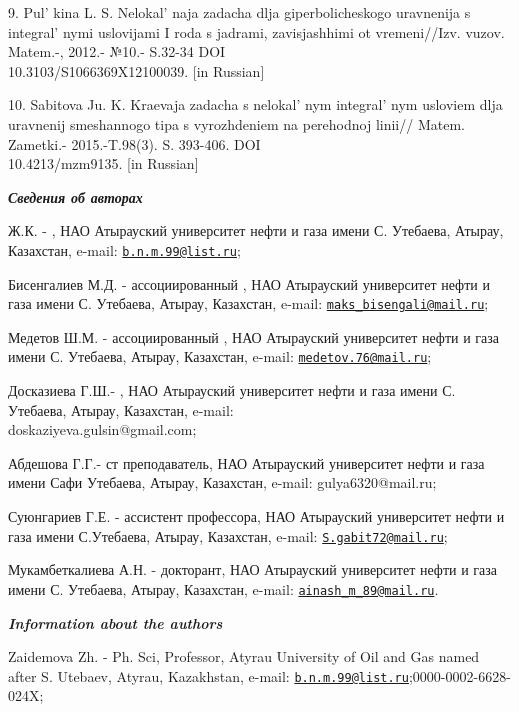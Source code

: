 \begin{references}
9. Pul' kina L. S. Nelokal' naja zadacha
dlja giperbolicheskogo uravnenija s integral' nymi
uslovijami I roda s jadrami, zavisjashhimi ot vremeni//Izv. vuzov.
Matem.-, 2012.- №10.- S.32-34 DOI \\10.3103/S1066369X12100039. {[}in
Russian{]}

10. Sabitova Ju. K. Kraevaja zadacha s nelokal' nym
integral' nym usloviem dlja uravnenij smeshannogo tipa s
vyrozhdeniem na perehodnoj linii// Matem. Zametki.- 2015.-T.98(3). S.
393-406. DOI \\10.4213/mzm9135. {[}in Russian{]}
\end{references}

\begin{authorinfo}
\emph{{\bfseries Сведения об авторах}}

Ж.К. - , НАО
Атырауский университет нефти и газа имени С. Утебаева, Атырау,
Казахстан, e-mail: \href{mailto:b.n.m.99@list.ru}{\nolinkurl{b.n.m.99@list.ru}};

Бисенгалиев М.Д. -  ассоциированный
, НАО Атырауский университет нефти и газа имени С.
Утебаева, Атырау, Казахстан, e-mail: \href{mailto:maks\_bisengali@mail.ru}{\nolinkurl{maks\_bisengali@mail.ru}};

Медетов Ш.М. -  ассоциированный
, НАО Атырауский университет нефти и газа имени С.
Утебаева, Атырау, Казахстан, e-mail: \href{mailto:medetov.76@mail.ru}{\nolinkurl{medetov.76@mail.ru}};

Досказиева Г.Ш.- , НАО
Атырауский университет нефти и газа имени С. Утебаева, Атырау,
Казахстан, e-mail: \\doskaziyeva.gulsin@gmail.com;

Абдешова Г.Г.- ст преподаватель, НАО Атырауский университет нефти и газа
имени Сафи Утебаева, Атырау, Казахстан, e-mail: gulya6320@mail.ru;

Суюнгариев Г.Е. -  ассистент профессора,
НАО Атырауский университет нефти и газа имени С.Утебаева, Атырау,
Казахстан, e-mail: \href{mailto:S.gabit72@mail.ru}{\nolinkurl{S.gabit72@mail.ru}};

Мукамбеткалиева А.Н. - докторант, НАО Атырауский университет нефти и
газа имени С. Утебаева, Атырау, Казахстан, e-mail: \href{mailto:ainash\_m_89@mail.ru}{\nolinkurl{ainash\_m\_89@mail.ru}}.

\emph{{\bfseries Information about the authors}}

Zaidemova Zh. - Ph. Sci, Professor, Atyrau Uni󠀁versity of Oil and Gas
nam󠀁ed aft󠀁er S. Ute󠀁baev, Aty󠀁rau, Kaz󠀁akhstan, e-mail:
\href{mailto:b.n.m.99@list.ru}{\nolinkurl{b.n.m.99@list.ru}};0000-0002-6628-024X;


\end{authorinfo}
